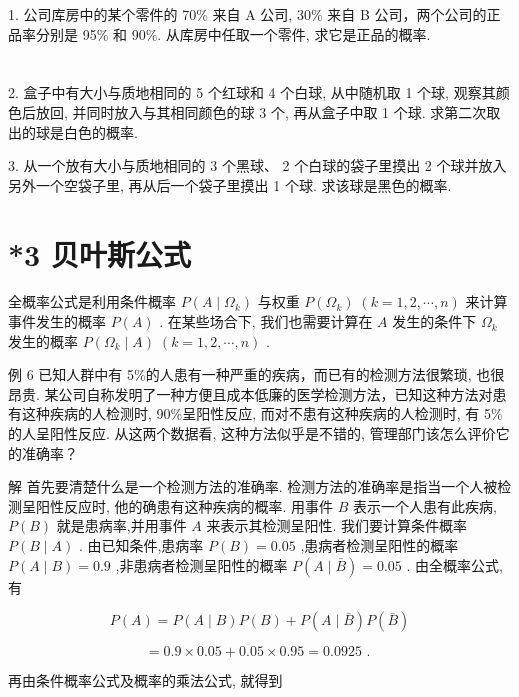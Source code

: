 \documentclass[10pt]{article}
\begin{document}
1. 公司库房中的某个零件的 70\% 来自 A 公司, 30\% 来自 B 公司，两个公司的正品率分别是 95\% 和 90\%. 从库房中任取一个零件, 求它是正品的概率.



\section*{}

2. 盒子中有大小与质地相同的 5 个红球和 4 个白球, 从中随机取 1 个球, 观察其颜色后放回, 并同时放入与其相同颜色的球 3 个, 再从盒子中取 1 个球. 求第二次取出的球是白色的概率.

3. 从一个放有大小与质地相同的 3 个黑球、 2 个白球的袋子里摸出 2 个球并放入另外一个空袋子里, 再从后一个袋子里摸出 1 个球. 求该球是黑色的概率.

\section*{*3 贝叶斯公式}

全概率公式是利用条件概率 \(P\left( {A \mid  {\Omega }_{k}}\right)\) 与权重 \(P\left( {\Omega }_{k}\right) \; \left( {k = 1,2,\cdots ,n}\right)\) 来计算事件发生的概率 \(P\left( A\right)\) . 在某些场合下, 我们也需要计算在 \(A\) 发生的条件下 \({\Omega }_{k}\) 发生的概率 \(P\left( {{\Omega }_{k} \mid  A}\right) \; \left( {k = 1,2,\cdots ,n}\right)\) .

例 6 已知人群中有 5\%的人患有一种严重的疾病，而已有的检测方法很繁琐, 也很昂贵. 某公司自称发明了一种方便且成本低廉的医学检测方法，已知这种方法对患有这种疾病的人检测时, 90\%呈阳性反应, 而对不患有这种疾病的人检测时, 有 5\%的人呈阳性反应. 从这两个数据看, 这种方法似乎是不错的, 管理部门该怎么评价它的准确率？

解 首先要清楚什么是一个检测方法的准确率. 检测方法的准确率是指当一个人被检测呈阳性反应时, 他的确患有这种疾病的概率. 用事件 \(B\) 表示一个人患有此疾病, \(P\left( B\right)\) 就是患病率,并用事件 \(A\) 来表示其检测呈阳性. 我们要计算条件概率 \(P\left( {B \mid  A}\right)\) . 由已知条件,患病率 \(P\left( B\right)  = {0.05}\) ,患病者检测呈阳性的概率 \(P\left( {A \mid  B}\right)  = {0.9}\) ,非患病者检测呈阳性的概率 \(P\left( {A \mid  \bar{B}}\right)  = {0.05}\) . 由全概率公式, 有

\[
P\left( A\right)  = P\left( {A \mid  B}\right) P\left( B\right)  + P\left( {A \mid  \bar{B}}\right) P\left( \bar{B}\right)
\]

\[
= {0.9} \times  {0.05} + {0.05} \times  {0.95} = {0.0925}\text{ . }
\]

再由条件概率公式及概率的乘法公式, 就得到
\end{document}

